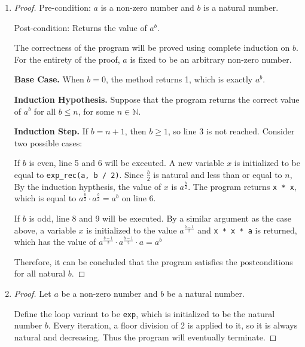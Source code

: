 \documentclass[11pt]{article}
\begin{document}
    \begin{enumerate}[label=(\alph*)]
        \item 
        \begin{proof}
            Pre-condition: \(a\) is a non-zero number and \(b\) is a natural number.
            
            Post-condition: Returns the value of \(a^b\).

            The correctness of the program will be proved using complete induction on \(b\). For the entirety of the proof, \(a\) is fixed to be an arbitrary non-zero number.

            \textbf{Base Case.} When \(b=0\), the method returns 1, which is exactly \(a^b\).

            \textbf{Induction Hypothesis.} Suppose that the program returns the correct value of \(a^b\) for all \(b \leq n\), for some \(n \in \mathbb{N}\).

            \textbf{Induction Step.} If \(b = n+1\), then \(b \geq 1\), so line 3 is not reached. Consider two possible cases:
            
            If \(b\) is even, line 5 and 6 will be executed. A new variable \(x\) is initialized to be equal to \verb|exp_rec(a, b / 2)|. Since \(\frac{b}{2}\) is natural and less than or equal to \(n\), By the induction hypthesis, the value of \(x\) is \(a^{\frac{b}{2}}\). The program returns \verb|x * x|, which is equal to \(a^{\frac{b}{2}} \cdot a^{\frac{b}{2}} = a^b\) on line 6. 

            If \(b\) is odd, line 8 and 9 will be executed. By a similar argument as the case above, a variable \(x\) is initialized to the value \(a^{\frac{b-1}{2}}\) and \verb|x * x * a| is returned, which has the value of \(a^{\frac{b-1}{2}} \cdot a^{\frac{b-1}{2}} \cdot a = a^b\)

            Therefore, it can be concluded that the program satisfies the postconditions for all natural \(b\).

        \end{proof}

        \item 
        \begin{proof}
            Let \(a\) be a non-zero number and \(b\) be a natural number. 
            
            Define the loop variant to be \verb|exp|, which is initialized to be the natural number \(b\). Every iteration, a floor division of 2 is applied to it, so it is always natural and decreasing. Thus the program will eventually terminate.
            

\end{proof}
\end{enumerate}
\end{document}
